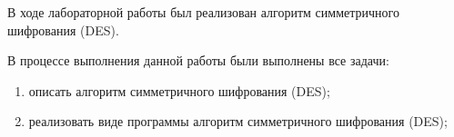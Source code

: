 
В ходе лабораторной работы был реализован алгоритм симметричного шифрования (DES).

В процессе выполнения данной работы были выполнены все задачи:
\begin{enumerate}[label={\arabic*)}]
	\item описать алгоритм симметричного шифрования (DES);
	\item реализовать виде программы алгоритм симметричного шифрования (DES);
\end{enumerate}